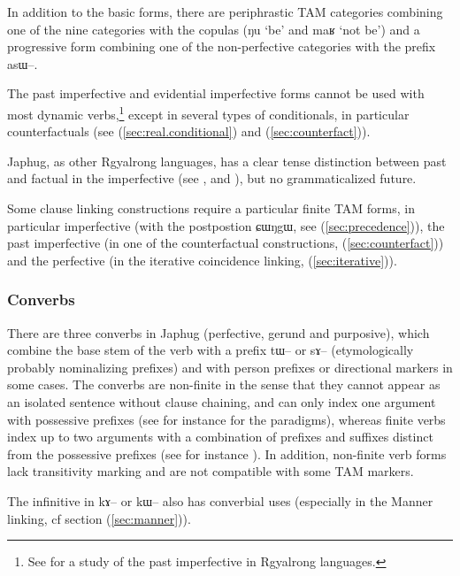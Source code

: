 \documentclass[oldfontcommands,oneside,a4paper,11pt]{article}
\newcommand{\ipa}[1]{{\phon \mbox{#1}}} %
\newcommand{\refb}[1]{(\ref{#1})}
\begin{document}
In addition to the basic forms, there are periphrastic TAM categories combining one of the nine categories with the copulas (\ipa{ŋu} `be' and \ipa{maʁ} `not be') and a progressive form combining one of the non-perfective categories with the prefix \ipa{asɯ}--.


The past imperfective  and   evidential imperfective forms cannot be used with most dynamic verbs,\footnote{ See \citealt{lin11direction} for a study of the past imperfective in Rgyalrong languages. } except in    several types of conditionals, in particular counterfactuals (see \refb{sec:real.conditional} and \refb{sec:counterfact}). 
  
 Japhug, as other Rgyalrong languages, has a clear tense distinction between past and factual in the imperfective (see \citealt{jackson00puxi}, \citealt{linyj03tense} and \citealt[371-392]{jacques04these}), but no grammaticalized future. 
 
 Some clause linking constructions require a particular finite TAM forms, in particular imperfective (with the postpostion \ipa{ɕɯŋgɯ}, see \refb{sec:precedence}), the past imperfective (in one of the counterfactual constructions, \refb{sec:counterfact}) and the perfective (in the iterative coincidence linking, \refb{sec:iterative}).
  
\subsubsection{Converbs} \label{sec:converbs}
 There are three converbs in Japhug (perfective, gerund and purposive), which combine the base stem of the verb with a  prefix \ipa{tɯ--} or \ipa{sɤ--} (etymologically probably nominalizing prefixes) and with person prefixes or directional markers in some cases. The converbs are non-finite in the sense that they cannot appear as an isolated sentence without clause chaining, and can only index one argument with possessive prefixes (see for instance \citealt[4]{jacques14antipassive} for the paradigms), whereas finite verbs index up to two arguments with a combination of prefixes and suffixes distinct from the possessive prefixes (see for instance \citealt[134]{jacques10inverse}). In addition, non-finite verb forms lack transitivity marking and are not compatible with some TAM markers.
 
 The infinitive in \ipa{kɤ--} or \ipa{kɯ--} also has converbial uses (especially in the Manner linking, cf section \refb{sec:manner}).
 
\end{document}
